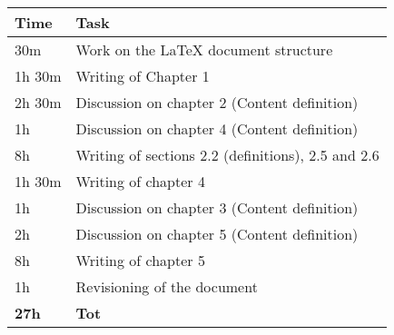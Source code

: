 \begin{center}
    {\renewcommand{\arraystretch}{2}%
    \begin{tabular}{L{2cm}L{12cm}}
        \hline
        \textbf{Time} & \textbf{Task} \\
        \hline
        30m & Work on the LaTeX document structure \\
        \hline
        1h 30m & Writing of Chapter 1 \\
        \hline
        2h 30m & Discussion on chapter 2 (Content definition) \\
        \hline
        1h & Discussion on chapter 4 (Content definition) \\
        \hline
        8h & Writing of sections 2.2 (definitions), 2.5 and 2.6 \\
        \hline
        1h 30m & Writing of chapter 4 \\
        \hline
        1h & Discussion on chapter 3 (Content definition) \\
        \hline
        2h & Discussion on chapter 5 (Content definition) \\
        \hline
        8h & Writing of chapter 5 \\
        \hline
        1h & Revisioning of the document \\
        \hline
        \textbf{27h} & \textbf{Tot} \\
    \end{tabular}}
\end{center}
